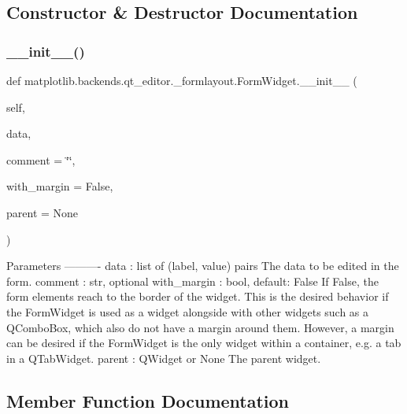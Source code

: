 \subsection{Constructor \& Destructor Documentation}
\mbox{\label{classmatplotlib_1_1backends_1_1qt__editor_1_1__formlayout_1_1FormWidget_a73966d57907faca29e1b43cf4d451619}} 
\subsubsection{\texorpdfstring{\+\_\+\+\_\+init\+\_\+\+\_\+()}{\_\_init\_\_()}}
{\footnotesize\ttfamily def matplotlib.\+backends.\+qt\+\_\+editor.\+\_\+formlayout.\+Form\+Widget.\+\_\+\+\_\+init\+\_\+\+\_\+ (\begin{DoxyParamCaption}\item[{}]{self,  }\item[{}]{data,  }\item[{}]{comment = {\ttfamily \char`\"{}\char`\"{}},  }\item[{}]{with\+\_\+margin = {\ttfamily False},  }\item[{}]{parent = {\ttfamily None} }\end{DoxyParamCaption})}

\begin{DoxyVerb}Parameters
----------
data : list of (label, value) pairs
    The data to be edited in the form.
comment : str, optional
with_margin : bool, default: False
    If False, the form elements reach to the border of the widget.
    This is the desired behavior if the FormWidget is used as a widget
    alongside with other widgets such as a QComboBox, which also do
    not have a margin around them.
    However, a margin can be desired if the FormWidget is the only
    widget within a container, e.g. a tab in a QTabWidget.
parent : QWidget or None
    The parent widget.
\end{DoxyVerb}
 

\subsection{Member Function Documentation}
\mbox{\label{classmatplotlib_1_1backends_1_1qt__editor_1_1__formlayout_1_1FormWidget_af53d62547745b63738fe2a7281cf83f8}} 
